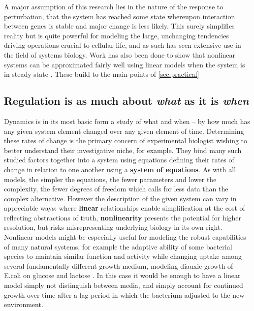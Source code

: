 A major assumption of this research lies in the nature of the response to perturbation, \ie that the system has reached some state whereupon interaction between genes is stable and major change is less likely. This surely simplifies reality but is quite powerful for modeling the large, unchanging tendencies driving operations crucial to cellular life, and as such has seen extensive use in the field of systems biology. Work has also been done to show that nonlinear systems can be approximated fairly well using linear models when the system is in steady state \citep{wildenhain2006reconstructing}. These build to the main points of \cref{sec:practical}



\subsection{Regulation is as much about \emph{what} as it is \emph{when}}
\label{sec:regwhatwhen}
Dynamics is in its most basic form a study of what and when -- by how much has any given system element changed over any given element of time. Determining these rates of change is the primary concern of experimental biologist wishing to better understand their investigative niche, for example. They bind many such studied factors together into a system using equations defining their rates of change in relation to one another using a \textbf{system of equations}. As with all models, the simpler the equations, \ie the fewer parameters and lower the complexity, the fewer degrees of freedom which calls for less data than the complex alternative. However the description of the given system can vary in appreciable ways: where \textbf{linear} relationships enable simplification at the cost of reflecting abstractions of truth, \textbf{nonlinearity} presents the potential for higher resolution, but risks misrepresenting underlying biology in its own right. Nonlinear models might be especially useful for modeling the robust capabilities of many natural systems, for example the adaptive ability of some bacterial species to maintain similar function and activity while changing uptake among several fundamentally different growth medium, \ie modeling diauxic growth of E.coli on glucose and lactose \citep{wong1997mathematical}. In this case it would be enough to have a linear model simply not distinguish between media, and simply account for continued growth over time after a lag period in which the bacterium adjusted to the new environment.


